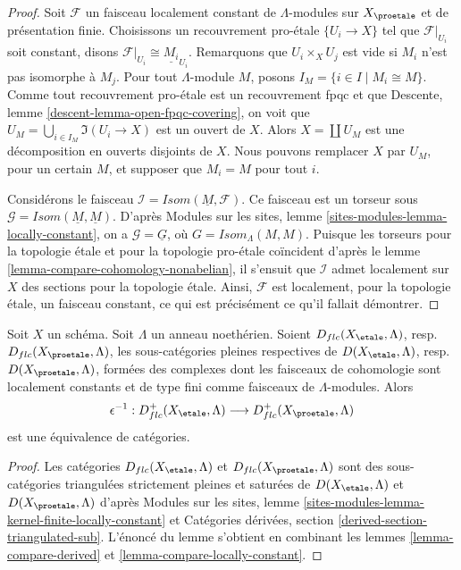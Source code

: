\begin{proof}
Soit $\mathcal{F}$ un faisceau localement constant de $\Lambda$-modules
sur $X_\proetale$ et de présentation finie. Choisissons un recouvrement pro-\'etale
$\{U_i \to X\}$ tel que $\mathcal{F}|_{U_i}$ soit constant, disons
$\mathcal{F}|_{U_i} \cong \underline{M_i}_{U_i}$.
Remarquons que $U_i \times_X U_j$ est vide si $M_i$ n'est pas isomorphe
à $M_j$.
Pour tout $\Lambda$-module $M$, posons $I_M = \{i \in I \mid M_i \cong M\}$.
Comme tout recouvrement pro-\'etale est un recouvrement fpqc et que
Descente, lemme \ref{descent-lemma-open-fpqc-covering},
on voit que $U_M = \bigcup_{i \in I_M} \Im(U_i \to X)$
est un ouvert de $X$. Alors $X = \coprod U_M$ est une décomposition en ouverts
disjoints de $X$. Nous pouvons remplacer $X$ par $U_M$, pour un certain $M$, et
supposer que $M_i = M$ pour tout $i$.

\medskip\noindent
Considérons le faisceau $\mathcal{I} = \mathit{Isom}(\underline{M}, \mathcal{F})$.
Ce faisceau est un torseur sous
$\mathcal{G} = \mathit{Isom}(\underline{M}, \underline{M})$.
D'après Modules sur les sites, lemme \ref{sites-modules-lemma-locally-constant},
on a $\mathcal{G} = \underline{G}$,
où $G = \mathit{Isom}_\Lambda(M, M)$.
Puisque les torseurs pour la topologie \'etale
et pour la topologie pro-\'etale coïncident d'après le
lemme \ref{lemma-compare-cohomology-nonabelian},
il s'ensuit que $\mathcal{I}$ admet localement sur $X$ des sections pour la topologie \'etale.
Ainsi, $\mathcal{F}$ est localement, pour la topologie \'etale, un faisceau constant, ce qui
est précisément ce qu'il fallait démontrer.
\end{proof}

\begin{lemma}
\label{lemma-compare-locally-constant-derived}
Soit $X$ un schéma. Soit $\Lambda$ un anneau noethérien.
Soient $D_{flc}(X_\etale, \Lambda)$, resp.\ $D_{flc}(X_\proetale, \Lambda)$,
les sous-catégories pleines respectives de
$D(X_\etale, \Lambda)$, resp.\ $D(X_\proetale, \Lambda)$,
formées des complexes dont les faisceaux de cohomologie sont localement
constants et de type fini comme faisceaux de $\Lambda$-modules. Alors
$$
\epsilon^{-1} :
D_{flc}^+(X_\etale, \Lambda)
\longrightarrow
D_{flc}^+(X_\proetale, \Lambda)
$$
est une équivalence de catégories.
\end{lemma}

\begin{proof}
Les catégories $D_{flc}(X_\etale, \Lambda)$ et $D_{flc}(X_\proetale, \Lambda)$
sont des sous-catégories triangulées strictement pleines et saturées de
$D(X_\etale, \Lambda)$ et $D(X_\proetale, \Lambda)$
d'après Modules sur les sites, lemme
\ref{sites-modules-lemma-kernel-finite-locally-constant}
et
Catégories dérivées, section \ref{derived-section-triangulated-sub}.
L'énoncé du lemme s'obtient en combinant les
lemmes \ref{lemma-compare-derived} et
\ref{lemma-compare-locally-constant}.
\end{proof}

